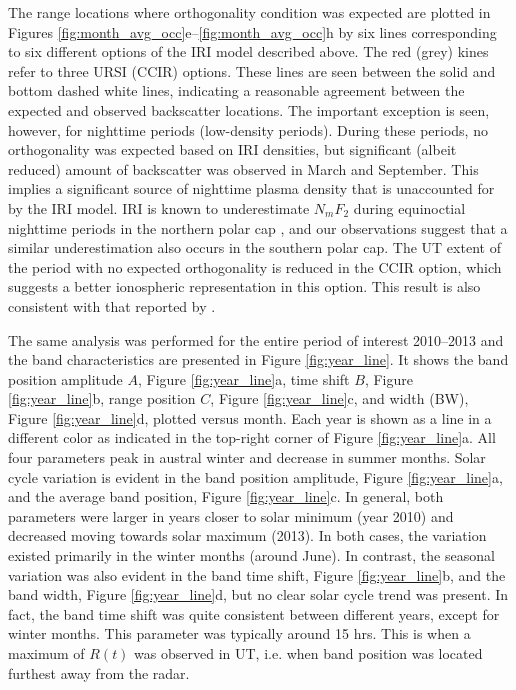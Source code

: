 The range locations where orthogonality condition was expected are plotted in Figures \ref{fig:month_avg_occ}e--\ref{fig:month_avg_occ}h by six lines corresponding to six different options of the IRI model described above.  The red (grey) kines refer to three URSI (CCIR) options.  These lines are seen between the solid and bottom dashed white lines, indicating a reasonable agreement between the expected and observed backscatter locations.  The important exception is seen, however, for nighttime periods (low-density periods).  During these periods, no orthogonality was expected based on IRI densities, but significant (albeit reduced) amount of backscatter was observed in March and September.  This implies a significant source of nighttime plasma density that is unaccounted for by the IRI model.  IRI is known to underestimate \(N_mF_2\) during equinoctial nighttime periods in the northern polar cap \citep{Themens2014}, and our observations suggest that a similar underestimation also occurs in the southern polar cap.  The UT extent of the period with no expected orthogonality is reduced in the CCIR option, which suggests a better ionospheric representation in this option.  This result is also consistent with that reported by \citet{Themens2014}.

The same analysis was performed for the entire period of interest 2010--2013 and the band characteristics are presented in Figure \ref{fig:year_line}. It shows the band position amplitude \(A\), Figure \ref{fig:year_line}a, time shift \(B\), Figure \ref{fig:year_line}b, range position \(C\), Figure \ref{fig:year_line}c, and width (BW), Figure \ref{fig:year_line}d, plotted versus month.  Each year is shown as a line in a different color as indicated in the top-right corner of Figure \ref{fig:year_line}a.  All four parameters peak in austral winter and decrease in summer months. Solar cycle variation is evident in the band position amplitude, Figure \ref{fig:year_line}a, and the average band position, Figure \ref{fig:year_line}c. In general, both parameters were larger in years closer to solar minimum (year 2010) and decreased moving towards solar maximum (2013).  In both cases, the variation existed primarily in the winter months (around June). In contrast, the seasonal variation was also evident in the band time shift, Figure \ref{fig:year_line}b, and the band width, Figure \ref{fig:year_line}d, but no clear solar cycle trend was present. In fact, the band time shift was quite consistent between different years, except for winter months. This parameter was typically around 15 hrs. This is when a maximum of \(R\left(t\right)\) was observed in UT, i.e. when band position was located furthest away from the radar.

